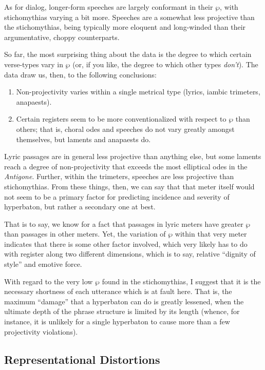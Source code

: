 \documentclass[letterpaper, 11pt]{article}
\newcommand{\FN}{\mathsf}
\begin{document}
As for dialog, longer-form speeches are largely conformant in their \ensuremath{\FN{\wp}},
with stichomythias varying a bit more. Speeches are a somewhat less projective
than the stichomythias, being typically more eloquent and long-winded than their
argumentative, choppy counterparts.

So far, the most surprising thing about the data is the degree to which certain
verse-types vary in \ensuremath{\FN{\wp}} (or, if you like, the degree to which other types
\emph{don't}). The data draw us, then, to the following conclusions:

\begin{enumerate}
\item Non-projectivity varies within a single metrical type (lyrics, iambic trimeters,
anapaests).

\item Certain registers seem to be more conventionalized with respect to \ensuremath{\FN{\wp}}
than others; that is, choral odes and speeches do not vary greatly amongst
themselves, but laments and anapaests do.
\end{enumerate}

\noindent
%
Lyric passages are in general less projective than anything else, but some
laments reach a degree of non-projectivity that exceeds the most elliptical odes
in the \emph{Antigone}. Further, within the trimeters, speeches are less projective
than stichomythias. From these things, then, we can say that that meter itself
would not seem to be a primary factor for predicting incidence and severity of
hyperbaton, but rather a secondary one at best.

That is to say, we know for a fact that passages in lyric meters have greater
\ensuremath{\FN{\wp}} than passages in other meters. Yet, the variation of \ensuremath{\FN{\wp}} within that
very meter indicates that there is some other factor involved, which very likely
has to do with register along two different dimensions, which is to say,
relative ``dignity of style'' and emotive force.

With regard to the very low \ensuremath{\FN{\wp}} found in the stichomythias, I suggest that
it is the necessary shortness of each utterance which is at fault here. That is,
the maximum ``damage'' that a hyperbaton can do is greatly lessened, when the
ultimate depth of the phrase structure is limited by its length (whence, for
instance, it is unlikely for a single hyperbaton to cause more than a few
projectivity violations).

\subsection{Representational Distortions}
\end{document}
